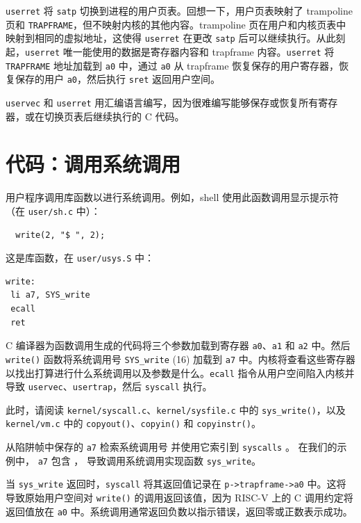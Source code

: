 {\tt userret} 将 {\tt satp} 切换到进程的用户页表。回想一下，用户页表映射了 trampoline 页和 {\tt TRAPFRAME}，但不映射内核的其他内容。trampoline 页在用户和内核页表中映射到相同的虚拟地址，这使得 {\tt userret} 在更改 {\tt satp} 后可以继续执行。从此刻起，{\tt userret} 唯一能使用的数据是寄存器内容和 trapframe 内容。{\tt userret} 将 {\tt TRAPFRAME} 地址加载到 {\tt a0} 中，通过 {\tt a0} 从 trapframe 恢复保存的用户寄存器，恢复保存的用户 {\tt a0}，然后执行 {\tt sret} 返回用户空间。

{\tt uservec} 和 {\tt userret} 用汇编语言编写，因为很难编写能够保存或恢复所有寄存器，或在切换页表后继续执行的 C 代码。

\section{代码：调用系统调用}

用户程序调用库函数以进行系统调用。例如，shell 使用此函数调用显示提示符（在 {\tt user/sh.c} 中）：

\begin{verbatim}
  write(2, "$ ", 2);
\end{verbatim}

这是库函数，在 {\tt user/usys.S} 中：

\begin{verbatim}
write:
 li a7, SYS_write
 ecall
 ret
\end{verbatim}

C 编译器为函数调用生成的代码将三个参数加载到寄存器 {\tt a0}、{\tt a1} 和 {\tt a2} 中。然后 {\tt write()} 函数将系统调用号 {\tt SYS\_write} (16) 加载到 {\tt a7} 中。内核将查看这些寄存器以找出打算进行什么系统调用以及参数是什么。\lstinline{ecall} 指令从用户空间陷入内核并导致
{\tt uservec}、{\tt usertrap}，然后 {\tt syscall} 执行。

此时，请阅读 {\tt kernel/syscall.c}、{\tt kernel/sysfile.c} 中的 {\tt sys\_write()}，以及 {\tt kernel/vm.c} 中的 {\tt copyout()}、{\tt copyin()} 和 {\tt copyinstr()}。

从陷阱帧中保存的
\texttt{a7}
检索系统调用号
并使用它索引到
{\tt syscalls}
。
在我们的示例中，
\texttt{a7}
包含
，
导致调用系统调用实现函数
\lstinline{sys_write}。

当 \lstinline{sys_write} 返回时，\lstinline{syscall} 将其返回值记录在 \lstinline{p->trapframe->a0} 中。这将导致原始用户空间对 {\tt write()} 的调用返回该值，因为 RISC-V 上的 C 调用约定将返回值放在 {\tt a0} 中。系统调用通常返回负数以指示错误，返回零或正数表示成功。

